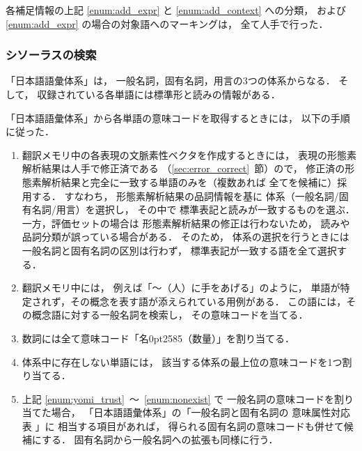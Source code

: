 各補足情報の上記 \ref{enum:add_expr} と \ref{enum:add_context} への分類，
および \ref{enum:add_expr} の場合の対象語へのマーキングは，
全て人手で行った．

\subsubsection{シソーラスの検索}
「日本語語彙体系」は，
一般名詞，固有名詞，用言の3つの体系からなる．
そして，
収録されている各単語には標準形と読みの情報がある．

「日本語語彙体系」から各単語の意味コードを取得するときには，
以下の手順に従った．

\begin{enumerate}
 \item \label{enum:yomi_trust}
       翻訳メモリ中の各表現の文脈素性ベクタを作成するときには，
       表現の形態素解析結果は人手で修正済である
       （\ref{sec:error_correct}~節）ので，
       修正済の形態素解析結果と完全に一致する単語のみを（複数あれば
       全てを候補に）採用する．
       すなわち，
       形態素解析結果の品詞情報を基に
       体系（一般名詞/固有名詞/用言）を選択し，
       その中で
       標準表記と読みが一致するものを選ぶ．
       一方，評価セットの場合は
       形態素解析結果の修正は行わないため，
       読みや品詞分類が誤っている場合がある．
       そのため，
       体系の選択を行うときには一般名詞と固有名詞の区別は行わず，
       標準表記が一致する語を全て選択する．
 \item 翻訳メモリ中には，
       例えば「〜\usebox{\mykern}（人）に手をあげる」のように，
       単語が特定されず，その概念を表す語が添えられている用例がある．
       この語には，その概念語に対する一般名詞を検索し，
       その意味コードを当てる．
 \item 数詞には全て意味コード「名\kern0pt2585（数量）」を割り当てる．
 \item \label{enum:nonexist}
       体系中に存在しない単語には，
       該当する体系の最上位の意味コードを1つ割り当てる．
 \item 上記 \ref{enum:yomi_trust}~〜~\ref{enum:nonexist} で
       一般名詞の意味コードを割り当てた場合，
       「日本語語彙体系」の「一般名詞と固有名詞の
       意味属性対応表 \cite[pp.~1:89--91]{ikehara:97}」に
       相当する項目があれば，
       得られる固有名詞の意味コードも併せて候補にする．
       固有名詞から一般名詞への拡張も同様に行う．
       
\end{enumerate}


